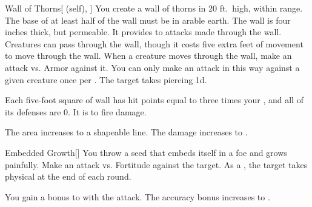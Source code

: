 \lowercase{\hypertarget{spell:Wall of Thorns}{}}\label{spell:Wall of Thorns}
\begin{attuneability}[Rank 3]{\hypertarget{spell:Wall of Thorns}{Wall of Thorns}}[ (self), ]
You create a wall of thorns in 20 ft.\ high, \areamed {} within \rngmed range.
The base of at least half of the wall must be in arable earth.
The wall is four inches thick, but permeable.
It provides  to attacks made through the wall.
Creatures can pass through the wall, though it costs five extra feet of movement to move through the wall.
When a creature moves through the wall, make an attack vs. Armor against it.
You can only make an attack in this way against a given creature once per .
\hit The target takes piercing  \minus1d.

Each five-foot square of wall has hit points equal to three times your , and all of its defenses are 0.
It is  to fire damage.

\rankline
{} The area increases to a \arealarge shapeable line.
 The damage increases to .

\end{attuneability}
\vspace{0.25em}



\lowercase{\hypertarget{spell:Embedded Growth}{}}\label{spell:Embedded Growth}
\begin{freeability}[Rank 4]{\hypertarget{spell:Embedded Growth}{Embedded Growth}}[]
You throw a seed that embeds itself in a foe and grows painfully.
Make an attack vs. Fortitude against the target.
\hit As a , the target takes physical  at the end of each round.

\rankline
{} You gain a  bonus to  with the attack.
 The accuracy bonus increases to .

\end{freeability}
\vspace{0.25em}



